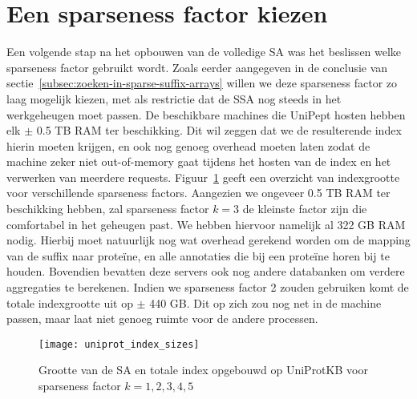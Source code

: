 \section{Een sparseness factor kiezen}
Een volgende stap na het opbouwen van de volledige SA was het beslissen welke sparseness factor gebruikt wordt.
Zoals eerder aangegeven in de conclusie van sectie~\ref{subsec:zoeken-in-sparse-suffix-arrays} willen we deze sparseness factor zo laag mogelijk kiezen, met als restrictie dat de SSA nog steeds in het werkgeheugen moet passen.
De beschikbare machines die UniPept hosten hebben elk $\pm$ 0.5 TB RAM ter beschikking.
Dit wil zeggen dat we de resulterende index hierin moeten krijgen, en ook nog genoeg overhead moeten laten zodat de machine zeker niet out-of-memory gaat tijdens het hosten van de index en het verwerken van meerdere requests.
Figuur~\ref{fig:uniprot_index_size_sparsenessfactors} geeft een overzicht van indexgrootte voor verschillende sparseness factors.
Aangezien we ongeveer 0.5 TB RAM ter beschikking hebben, zal sparseness factor $k = 3$ de kleinste factor zijn die comfortabel in het geheugen past.
We hebben hiervoor namelijk al 322 GB RAM nodig.
Hierbij moet natuurlijk nog wat overhead gerekend worden om de mapping van de suffix naar proteïne, en alle annotaties die bij een proteïne horen bij te houden.
Bovendien bevatten deze servers ook nog andere databanken om verdere aggregaties te berekenen.
Indien we sparseness factor 2 zouden gebruiken komt de totale indexgrootte uit op $\pm$ 440 GB\@.
Dit op zich zou nog net in de machine passen, maar laat niet genoeg ruimte voor de andere processen.

\begin{figure}[h!]
    \centering
    \texttt{[image: uniprot\_index\_sizes]}
    \caption{Grootte van de SA en totale index opgebouwd op UniProtKB voor sparseness factor $k = 1, 2, 3, 4, 5$}
    \label{fig:uniprot_index_size_sparsenessfactors}
\end{figure}

